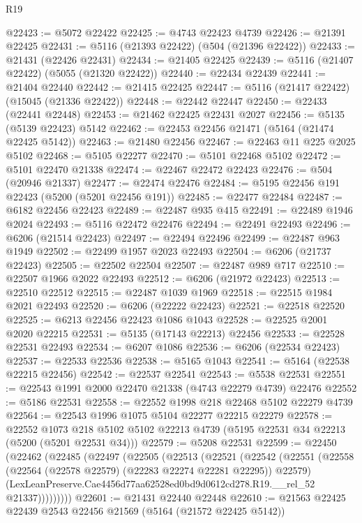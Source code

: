 \begin{lexlean}{R19}
\begin{coremodule}
{{{{{{{{{{{@22423 := @5072 @22422
@22425 := @4743 @22423 @4739
@22426 := @21391 @22425
@22431 := @5116 (@21393 @22422) (@504 (@21396 @22422))
@22433 := @21431 (@22426 @22431)
@22434 := @21405 @22425
@22439 := @5116 (@21407 @22422) (@5055 (@21320 @22422))
@22440 := @22434 @22439
@22441 := @21404 @22440
@22442 := @21415 @22425
@22447 := @5116 (@21417 @22422) (@15045 (@21336 @22422))
@22448 := @22442 @22447
@22450 := @22433 (@22441 @22448)
@22453 := @21462 @22425 @22431 @2027
@22456 := @5135 (@5139 @22423) @5142
@22462 := @22453 @22456 @21471 (@5164 (@21474 @22425 @5142))
@22463 := @21480 @22456
@22467 := @22463 @11 @225 @2025 @5102
@22468 := @5105 @22277
@22470 := @5101 @22468 @5102
@22472 := @5101 @22470 @21338
@22474 := @22467 @22472 @22423
@22476 := @504 (@20946 @21337)
@22477 := @22474 @22476
@22484 := @5195 @22456 @191 @22423 (@5200 (@5201 @22456 @191))
@22485 := @22477 @22484
@22487 := @6182 @22456 @22423
@22489 := @22487 @935 @415
@22491 := @22489 @1946 @2024
@22493 := @5116 @22472 @22476
@22494 := @22491 @22493
@22496 := @6206 (@21514 @22423)
@22497 := @22494 @22496
@22499 := @22487 @963 @1949
@22502 := @22499 @1957 @2023 @22493
@22504 := @6206 (@21737 @22423)
@22505 := @22502 @22504
@22507 := @22487 @989 @717
@22510 := @22507 @1966 @2022 @22493
@22512 := @6206 (@21972 @22423)
@22513 := @22510 @22512
@22515 := @22487 @1039 @1969
@22518 := @22515 @1984 @2021 @22493
@22520 := @6206 (@22222 @22423)
@22521 := @22518 @22520
@22525 := @6213 @22456 @22423 @1086 @1043
@22528 := @22525 @2001 @2020 @22215
@22531 := @5135 (@17143 @22213) @22456
@22533 := @22528 @22531 @22493
@22534 := @6207 @1086
@22536 := @6206 (@22534 @22423)
@22537 := @22533 @22536
@22538 := @5165 @1043
@22541 := @5164 (@22538 @22215 @22456)
@22542 := @22537 @22541
@22543 := @5538 @22531
@22551 := @22543 @1991 @2000 @22470 @21338 (@4743 @22279 @4739) @22476
@22552 := @5186 @22531
@22558 := @22552 @1998 @218 @22468 @5102 @22279 @4739
@22564 := @22543 @1996 @1075 @5104 @22277 @22215 @22279
@22578 := @22552
    @1073
    @218
    @5102
    @5102
    @22213
    @4739
    (@5195 @22531 @34 @22213 (@5200 (@5201 @22531 @34)))
@22579 := @5208 @22531
@22599 := @22450
    (@22462
      (@22485
        (@22497
          (@22505
            (@22513
              (@22521
                (@22542
                  (@22551
                    (@22558 (@22564 (@22578 @22579) (@22283 @22274 @22281 @22295)) @22579)
                    (LexLeanPreserve.Cae4456d77aa62528ed0bd9d0612cd278.R19.__rel_52 @21337)))))))))
@22601 := @21431 @22440 @22448
@22610 := @21563 @22425 @22439 @2543 @22456 @21569 (@5164 (@21572 @22425 @5142))
}}}}}}}}}}}
\end{coremodule}
\end{lexlean}
